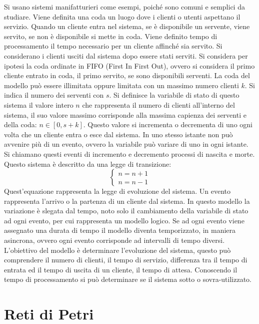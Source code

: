 \documentclass{article}
\numberwithin{equation}{subsection}
\begin{document}
Si usano sistemi manifatturieri come esempi, poiché sono comuni e semplici da studiare. Viene definita una coda un luogo dove i clienti o utenti aspettano il servizio. Quando un 
cliente entra nel sistema, se è disponibile un servente, viene servito, se non è disponibile si mette in coda. Viene definito tempo di processamento il tempo 
necessario per un cliente affinché sia servito. Si considerano i clienti usciti dal sistema dopo essere stati serviti. Si considera per ipotesi la coda ordinate in FIFO (First 
In First Out), ovvero si considera il primo cliente entrato in coda, il primo servito, se sono disponibili serventi. La coda del modello può essere illimitata oppure 
limitata con un massimo numero clienti $k$. Si indica il numero dei serventi con $s$. Si definisce la variabile di stato di questo sistema il valore intero $n$ che 
rappresenta il numero di clienti all'interno del sistema, il suo valore massimo corrisponde alla massima capienza dei serventi e della coda: $n\in[0,s+k]$. Questo valore 
si incrementa o decrementa di uno ogni volta che un cliente entra o esce dal sistema. In uno stesso istante non può avvenire più di un evento, ovvero la variabile può 
variare di uno in ogni istante. Si chiamano questi eventi di incremento e decremento processi di nascita e morte. Questo sistema è descritto da una legge di transizione:
\begin{equation*}
    \begin{cases}
        n=n+1\\
        n=n-1
    \end{cases}
\end{equation*}
Quest'equazione rappresenta la legge di evoluzione del sistema. Un evento rappresenta l'arrivo o la partenza di un cliente dal sistema. In questo modello la variazione è slegata 
dal tempo, noto solo il cambiamento della variabile di stato ad ogni evento, per cui rappresenta un modello logico. Se ad ogni evento viene assegnato una durata di tempo il 
modello diventa temporizzato, in maniera asincrona, ovvero ogni evento corrisponde ad intervalli di tempo diversi. L'obiettivo del modello è determinare l'evoluzione del sistema, 
questo può comprendere il numero di clienti, il tempo di servizio, differenza tra il tempo di entrata ed il tempo di uscita di un cliente, il tempo di attesa. Conoscendo il 
tempo di processamento si può determinare se il sistema sotto o sovra-utilizzato.

\clearpage

\section{Reti di Petri}
\end{document}
